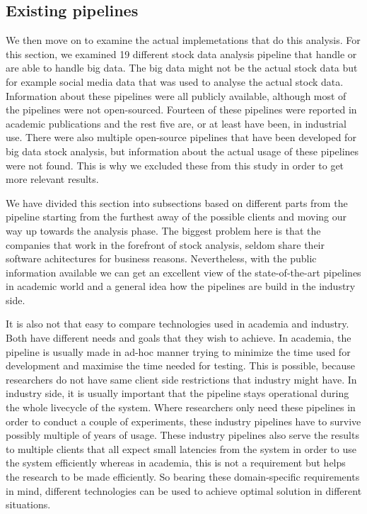 \subsection{Existing pipelines}

We then move on to examine the actual implemetations that do this analysis.
For this section, we examined 19 different stock data analysis pipeline that handle or are able to handle big data.
The big data might not be the actual stock data but for example social media data that was used to analyse the actual stock data.
Information about these pipelines were all publicly available, although most of the pipelines were not open-sourced.
Fourteen of these pipelines were reported in academic publications and the rest five are, or at least have been, in industrial use.
There were also multiple open-source pipelines that have been developed for big data stock analysis, but information about the actual usage of these pipelines were not found.
This is why we excluded these from this study in order to get more relevant results.

We have divided this section into subsections based on different parts from the pipeline starting from the furthest away of the possible clients and moving our way up towards the analysis phase.
The biggest problem here is that the companies that work in the forefront of stock analysis, seldom share their software achitectures for business reasons.
Nevertheless, with the public information available we can get an excellent view of the state-of-the-art pipelines in academic world and a general idea how the pipelines are build in the industry side.

It is also not that easy to compare technologies used in academia and industry.
Both have different needs and goals that they wish to achieve.
In academia, the pipeline is usually made in ad-hoc manner trying to minimize the time used for development and maximise the time needed for testing.
This is possible, because researchers do not have same client side restrictions that industry might have.
In industry side, it is usually important that the pipeline stays operational during the whole livecycle of the system.
Where researchers only need these pipelines in order to conduct a couple of experiments, these industry pipelines have to survive possibly multiple of years of usage.
These industry pipelines also serve the results to multiple clients that all expect small latencies from the system in order to use the system efficiently whereas in academia, this is not a requirement but helps the research to be made efficiently.
So bearing these domain-specific requirements in mind, different technologies can be used to achieve optimal solution in different situations.

